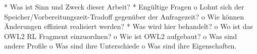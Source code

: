     * Was ist Sinn und Zweck dieser Arbeit?
    * Engültige Fragen
          o Lohnt sich der Speicher/Vorbereitungszeit-Tradoff gegenüber der Anfragezeit?
          o Wie können Änderungen effizient realisiert werden? 
    * Was wird hier behandelt?
          o Wo ist das OWL2 RL Fragment einzuordnen?
          o Wie ist OWL2 aufgebaut?
          o Was sind andere Profile
          o Was sind ihre Unterschiede
          o Was sind ihre Eigenschaften. 